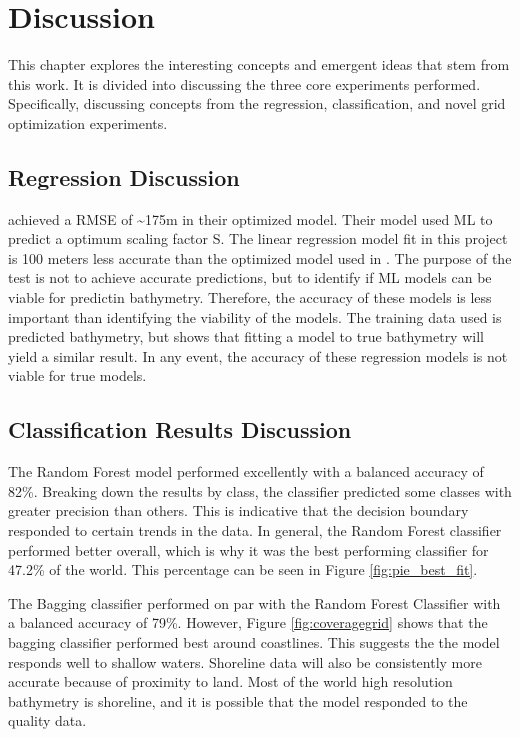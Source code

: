 \section{Discussion}
\setlength{\parindent}{10ex}
This chapter explores the interesting concepts and emergent ideas that stem from this work.
It is divided into discussing the three core experiments performed.
Specifically, discussing concepts from the regression, classification, and novel grid optimization experiments.

\subsection{Regression Discussion}
\cite{jena2012prediction} achieved a \ac{RMSE} of \~{}175m in their optimized model.
Their model used \ac{ML} to predict a optimum scaling factor S.
The linear regression model fit in this project is 100 meters less accurate than the optimized model used in \cite{jena2012prediction}.
The purpose of the test is not to achieve accurate predictions, but to identify if \ac{ML} models can be viable for predictin bathymetry.
Therefore, the accuracy of these models is less important than identifying the viability of the models.
The training data used is predicted bathymetry, but shows that fitting a model to true bathymetry will yield a similar result.
In any event, the accuracy of these regression models is not viable for true models.

\subsection{Classification Results Discussion}
The Random Forest model performed excellently with a balanced accuracy of 82\%.
Breaking down the results by class, the classifier predicted some classes with greater precision than others.
This is indicative that the decision boundary responded to certain trends in the data.
In general, the Random Forest classifier performed better overall, which is why it was the best performing classifier for 47.2\% of the world.
This percentage can be seen in Figure \ref{fig:pie_best_fit}.

\par
The Bagging classifier performed on par with the Random Forest Classifier with a balanced accuracy of 79\%.
However, Figure \ref{fig:coveragegrid} shows that the bagging classifier performed best around coastlines.
This suggests the the model responds well to shallow waters.
Shoreline data will also be consistently more accurate because of proximity to land.
Most of the world high resolution bathymetry is shoreline, and it is possible that the model responded to the quality data.


